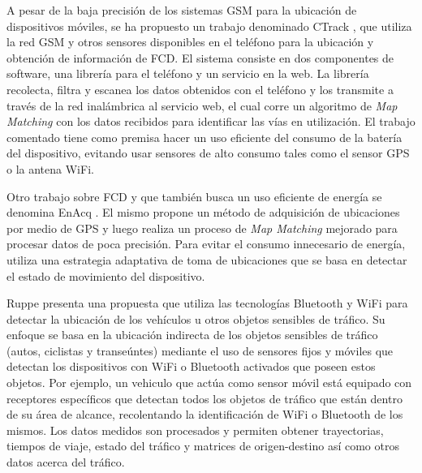 A pesar de la baja precisión de los sistemas GSM para la ubicación de dispositivos móviles, se ha propuesto un trabajo denominado CTrack \citep{thiagarajan2011accurate}, que utiliza la red GSM y otros sensores disponibles en el teléfono para la ubicación y obtención de información de FCD. El sistema consiste en dos componentes de software, una librería para el teléfono y un servicio en la web. La librería recolecta, filtra y escanea los datos obtenidos con el teléfono y los transmite a través de la red inalámbrica al servicio web, el cual corre un algoritmo de \emph{Map Matching} con los datos recibidos para identificar las vías en utilización. El trabajo comentado tiene como premisa hacer un uso eficiente del consumo de la batería del dispositivo, evitando usar sensores de alto consumo tales como el sensor GPS o la antena WiFi.

Otro trabajo sobre FCD y que también busca un uso eficiente de energía se denomina EnAcq \citep{fang2011enacq}. El mismo propone un método de adquisición de ubicaciones por medio de GPS y luego realiza un proceso de \emph{Map Matching} mejorado para procesar datos de poca precisión. Para evitar el consumo innecesario de energía, utiliza una estrategia adaptativa de toma de ubicaciones que se basa en detectar el estado de movimiento del dispositivo.

Ruppe\citep{ruppe2012augmenting} presenta una propuesta que utiliza las tecnologías Bluetooth y WiFi para detectar la ubicación de los vehículos u otros objetos sensibles de tráfico. Su enfoque se basa en la ubicación indirecta de los objetos sensibles de tráfico (autos, ciclistas y transeúntes) mediante el uso de sensores fijos y móviles que detectan los dispositivos con WiFi o Bluetooth activados que poseen estos objetos. Por ejemplo, un vehiculo que actúa como sensor móvil está equipado con receptores específicos que detectan todos los objetos de tráfico que están dentro de su área de alcance, recolentando la identificación de WiFi o Bluetooth de los mismos. Los datos medidos son procesados y permiten obtener trayectorias, tiempos de viaje, estado del tráfico y matrices de origen-destino así como otros datos acerca del tráfico.
